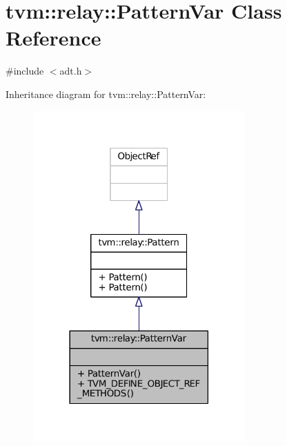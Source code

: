 \hypertarget{classtvm_1_1relay_1_1PatternVar}{}\section{tvm\+:\+:relay\+:\+:Pattern\+Var Class Reference}
\label{classtvm_1_1relay_1_1PatternVar}


{\ttfamily \#include $<$adt.\+h$>$}



Inheritance diagram for tvm\+:\+:relay\+:\+:Pattern\+Var\+:
\nopagebreak
\begin{figure}[H]
\begin{center}
\leavevmode
\includegraphics[width=230pt]{classtvm_1_1relay_1_1PatternVar__inherit__graph}
\end{center}
\end{figure}


